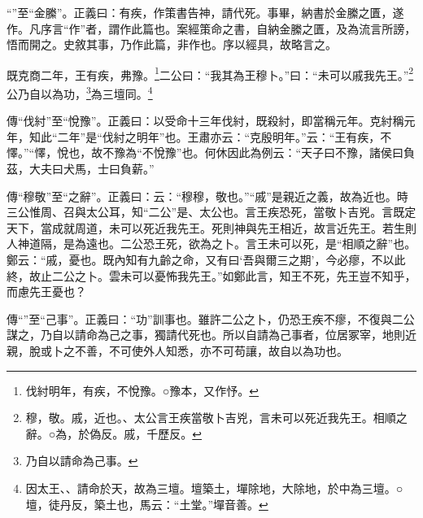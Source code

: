{\noindent\shu{}\fzkt “”至“金縢”。正義曰：有疾，作策書告神，請代死。事畢，納書於金縢之匱，遂作。凡序言“作”者，謂作此篇也。案經策命之書，自納金縢之匱，及為流言所謗，悟而開之。史敘其事，乃作此篇，非作也。序以經具，故略言之。 \par}

既克商二年，王有疾，弗豫。\footnote{伐紂明年，有疾，不悅豫。○豫本，又作忬。}二公曰：“我其為王穆卜。”曰：“未可以戚我先王。”\footnote{穆，敬。戚，近也。、太公言王疾當敬卜吉兇，言未可以死近我先王。相順之辭。○為，於偽反。戚，千歷反。}公乃自以為功，\footnote{乃自以請命為己事。}為三壇同。\footnote{因太王、、請命於天，故為三壇。壇築土，墠除地，大除地，於中為三壇。○壇，徒丹反，築土也，馬云：“土堂。”墠音善。}

{\noindent\zhuan{}\fzbyks 傳“伐紂”至“悅豫”。正義曰：以受命十三年伐紂，既殺紂，即當稱元年。克紂稱元年，知此“二年”是“伐紂之明年”也。王肅亦云：“克殷明年。”云：“王有疾，不懌。”“懌，悅也，故不豫為“不悅豫”也。何休因此為例云：“天子曰不豫，諸侯曰負茲，大夫曰犬馬，士曰負薪。” \par}

{\noindent\zhuan{}\fzbyks 傳“穆敬”至“之辭”。正義曰：云：“穆穆，敬也。”“戚”是親近之義，故為近也。時三公惟周、召與太公耳，知“二公”是、太公也。言王疾恐死，當敬卜吉兇。言既定天下，當成就周道，未可以死近我先王。死則神與先王相近，故言近先王。若生則人神道隔，是為遠也。二公恐王死，欲為之卜。言王未可以死，是“相順之辭”也。鄭云：“戚，憂也。既內知有九齡之命，又有曰‘吾與爾三之期’，今必瘳，不以此終，故止二公之卜。雲未可以憂怖我先王。”如鄭此言，知王不死，先王豈不知乎，而慮先王憂也？ \par}

{\noindent\zhuan{}\fzbyks 傳“”至“己事”。正義曰：“功”訓事也。雖許二公之卜，仍恐王疾不瘳，不復與二公謀之，乃自以請命為己之事，獨請代死也。所以自請為己事者，位居冢宰，地則近親，脫或卜之不善，不可使外人知悉，亦不可苟讓，故自以為功也。 \par}

